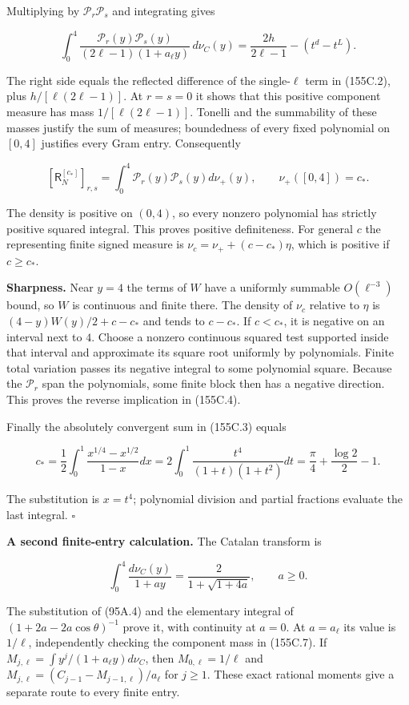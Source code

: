 \documentclass[
  11pt,
]{book}
\begin{document}
Multiplying by \(\mathcal P_r\mathcal P_s\) and integrating gives

\[
\boxed{\int_0^4\frac{\mathcal P_r(y)\mathcal P_s(y)}
{(2\ell-1)(1+a_\ell y)}\,d\nu_C(y)
=\frac{2h}{2\ell-1}-(t^d-t^L).}
\tag{155C.7}
\]

The right side equals the reflected difference of the single-\(\ell\)
term in (155C.2), plus \(h/[\ell(2\ell-1)]\). At \(r=s=0\) it shows that
this positive component measure has mass \(1/[\ell(2\ell-1)]\). Tonelli
and the summability of these masses justify the sum of measures;
boundedness of every fixed polynomial on \([0,4]\) justifies every Gram
entry. Consequently

\[
[\mathsf R_N^{[c_*]}]_{r,s}
=\int_0^4\mathcal P_r(y)\mathcal P_s(y)d\nu_+(y),
\qquad \nu_+([0,4])=c_*.
\tag{155C.8}
\]

The density is positive on \((0,4)\), so every nonzero polynomial has
strictly positive squared integral. This proves positive definiteness.
For general \(c\) the representing finite signed measure is
\(\nu_c=\nu_++(c-c_*)\eta\), which is positive if \(c\ge c_*\).

\textbf{Sharpness.} Near \(y=4\) the terms of \(W\) have a uniformly
summable \(O(\ell^{-3})\) bound, so \(W\) is continuous and finite
there. The density of \(\nu_c\) relative to \(\eta\) is
\((4-y)W(y)/2+c-c_*\) and tends to \(c-c_*\). If \(c<c_*\), it is
negative on an interval next to \(4\). Choose a nonzero continuous
squared test supported inside that interval and approximate its square
root uniformly by polynomials. Finite total variation passes its
negative integral to some polynomial square. Because the
\(\mathcal P_r\) span the polynomials, some finite block then has a
negative direction. This proves the reverse implication in (155C.4).

Finally the absolutely convergent sum in (155C.3) equals

\[
c_*=\frac12\int_0^1\frac{x^{1/4}-x^{1/2}}{1-x}dx
=2\int_0^1\frac{t^4}{(1+t)(1+t^2)}dt
=\frac\pi4+\frac{\log2}{2}-1.
\tag{155C.9}
\]

The substitution is \(x=t^4\); polynomial division and partial fractions
evaluate the last integral. \(\square\)

\textbf{A second finite-entry calculation.} The Catalan transform is

\[
\int_0^4\frac{d\nu_C(y)}{1+ay}
=\frac2{1+\sqrt{1+4a}},\qquad a\ge0.
\tag{155C.10}
\]

The substitution of (95A.4) and the elementary integral of
\((1+2a-2a\cos\theta)^{-1}\) prove it, with continuity at \(a=0\). At
\(a=a_\ell\) its value is \(1/\ell\), independently checking the
component mass in (155C.7). If
\(M_{j,\ell}=\int y^j/(1+a_\ell y)d\nu_C\), then \(M_{0,\ell}=1/\ell\)
and \(M_{j,\ell}=(C_{j-1}-M_{j-1,\ell})/a_\ell\) for \(j\ge1\). These
exact rational moments give a separate route to every finite entry.
\end{document}
